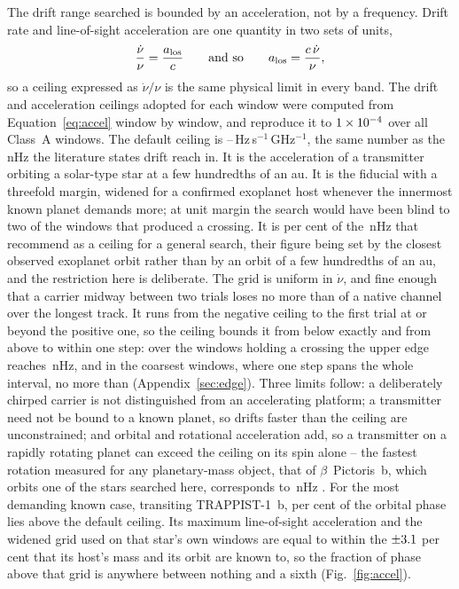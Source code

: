 The drift range searched is bounded by an acceleration, not by a
frequency. Drift rate and line-of-sight acceleration are one quantity in
two sets of units,
%
\begin{equation}
\frac{\dot\nu}{\nu}=\frac{a_{\rm los}}{c}
\qquad\text{and so}\qquad
a_{\rm los}=\frac{c\,\dot\nu}{\nu},
\label{eq:accel}
\end{equation}
%
so a ceiling expressed as $\dot\nu/\nu$ is the same physical limit in
every band. The drift and acceleration ceilings adopted for each window
were computed from Equation~\ref{eq:accel} window by window, and
reproduce it to $1\times10^{-4}$ over all \DriftRelNWin{} Class~A windows.
The default ceiling is
\DriftCeilLo--\DriftCeilHi\,Hz\,s$^{-1}$\,GHz$^{-1}$, the same number as
the nHz the literature states drift reach in. It is the acceleration of a
transmitter orbiting a solar-type star at a few hundredths of an au. It is the \citet{Mason2025} fiducial with a
threefold margin, widened for a confirmed exoplanet host whenever the
innermost known planet demands more; at unit margin the search would have
been blind to two of the windows that produced a crossing. It is
\AccelSheikhPct{} per cent of the \AccelSheikhNHz\,nHz that
\citet{Sheikh2019} recommend as a ceiling for a general search, their figure
being set by the closest observed exoplanet orbit rather than by an orbit of
a few hundredths of an au, and the restriction here is deliberate. The grid is uniform
in $\dot\nu$, and fine enough
that a carrier midway between two trials loses no more than
\DriftGridFineHalf{} of a native channel over the longest track. It runs
from the negative ceiling to the first trial at or beyond the positive one,
so the ceiling bounds it from below exactly and from above to within one
step: over the windows holding a crossing the upper edge reaches
\EgTopMeasANHz\,nHz, and in the coarsest windows, where one step spans the
whole interval, no more than \EgTopBoundBNHz{} (Appendix~\ref{sec:edge}).
Three
limits follow: a deliberately chirped carrier is not distinguished from an
accelerating platform; a transmitter need not be bound to a known planet,
so drifts faster than the ceiling are unconstrained; and orbital and
rotational acceleration add, so a transmitter on a rapidly rotating planet
can exceed the ceiling on its spin alone -- the fastest rotation measured for
any planetary-mass object, that of $\beta$~Pictoris~b, which orbits one of the
stars searched here, corresponds to \AccelBpicRotNHz\,nHz
\citep{Sheikh2019}. For the most demanding known case,
transiting TRAPPIST-1~b, \TrapPhaseHi{} per cent of the orbital phase lies
above the default ceiling. Its maximum line-of-sight acceleration and the
widened grid used on that star's own windows are equal to within the
$\pm3.1$ per cent that its host's mass and its orbit are known to, so
the fraction of phase above that grid is anywhere between nothing and a sixth
(Fig.~\ref{fig:accel}).

